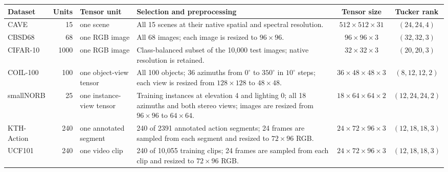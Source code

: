 \begin{tabular}{@{}l r p{1.05in} p{3.05in} c c@{}}
\toprule
Dataset & Units & Tensor unit & Selection and preprocessing & Tensor size & Tucker rank \\
\midrule
CAVE
& 15
& one scene
& All 15 scenes at their native spatial and spectral resolution.
& $512\times512\times31$
& $(24,24,4)$ \\

CBSD68
& 68
& one RGB image
& All 68 images; each image is resized to $96\times96$.
& $96\times96\times3$
& $(32,32,3)$ \\

CIFAR-10
& 1000
& one RGB image
& Class-balanced subset of the 10,000 test images; native resolution is retained.
& $32\times32\times3$
& $(20,20,3)$ \\

COIL-100
& 100
& one object-view tensor
& All 100 objects; 36 azimuths from $0^\circ$ to $350^\circ$ in $10^\circ$ steps; each view is resized from $128\times128$ to $48\times48$.
& $36\times48\times48\times3$
& $(8,12,12,2)$ \\

smallNORB
& 25
& one instance-view tensor
& Training instances at elevation 4 and lighting 0; all 18 azimuths and both stereo views; images are resized from $96\times96$ to $64\times64$.
& $18\times64\times64\times2$
& $(12,24,24,2)$ \\

KTH-Action
& 240
& one annotated segment
& 240 of 2391 annotated action segments; 24 frames are sampled from each segment and resized to $72\times96$ RGB.
& $24\times72\times96\times3$
& $(12,18,18,3)$ \\

UCF101
& 240
& one video clip
& 240 of 10,055 training clips; 24 frames are sampled from each clip and resized to $72\times96$ RGB.
& $24\times72\times96\times3$
& $(12,18,18,3)$ \\
\bottomrule
\end{tabular}
